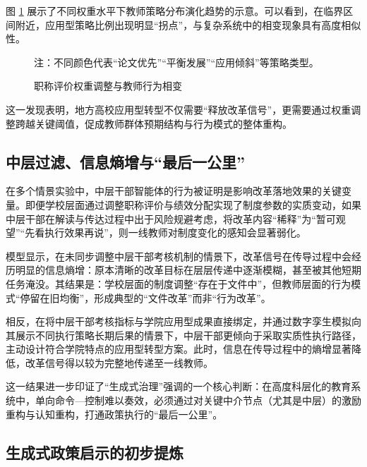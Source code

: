 \documentclass[UTF8, zihao=-4, fontset=mac]{ctexart}
\begin{document}
图 \ref{fig:phase-transition} 展示了不同权重水平下教师策略分布演化趋势的示意。可以看到，在临界区间附近，应用型策略比例出现明显“拐点”，与复杂系统中的相变现象具有高度相似性。

\begin{figure}[htbp]
    \centering
    \caption{职称评价权重调整与教师行为相变}
    \label{fig:phase-transition}
    \vspace{-0.5em}
    {\footnotesize \kaishu 注：不同颜色代表“论文优先”“平衡发展”“应用倾斜”等策略类型。}
\end{figure}

这一发现表明，地方高校应用型转型不仅需要“释放改革信号”，更需要通过权重调整跨越关键阈值，促成教师群体预期结构与行为模式的整体重构。

\subsection{中层过滤、信息熵增与“最后一公里”}

在多个情景实验中，中层干部智能体的行为被证明是影响改革落地效果的关键变量。即便学校层面通过调整职称评价与绩效分配实现了制度参数的实质变动，如果中层干部在解读与传达过程中出于风险规避考虑，将改革内容“稀释”为“暂可观望”“先看执行效果再说”，则一线教师对制度变化的感知会显著弱化。

模型显示，在未同步调整中层干部考核机制的情景下，改革信号在传导过程中会经历明显的信息熵增：原本清晰的改革目标在层层传递中逐渐模糊，甚至被其他短期任务淹没。其结果是：学校层面的制度调整“存在于文件中”，但教师层面的行为模式“停留在旧均衡”，形成典型的“文件改革”而非“行为改革”。

相反，在将中层干部考核指标与学院应用型成果直接绑定，并通过数字孪生模拟向其展示不同执行策略长期后果的情景下，中层干部更倾向于采取实质性执行路径，主动设计符合学院特点的应用型转型方案。此时，信息在传导过程中的熵增显著降低，改革信号得以较为完整地传递至一线教师。

这一结果进一步印证了“生成式治理”强调的一个核心判断：在高度科层化的教育系统中，单向命令—控制难以奏效，必须通过对关键中介节点（尤其是中层）的激励重构与认知重构，打通政策执行的“最后一公里”。

\subsection{生成式政策启示的初步提炼}
\end{document}
